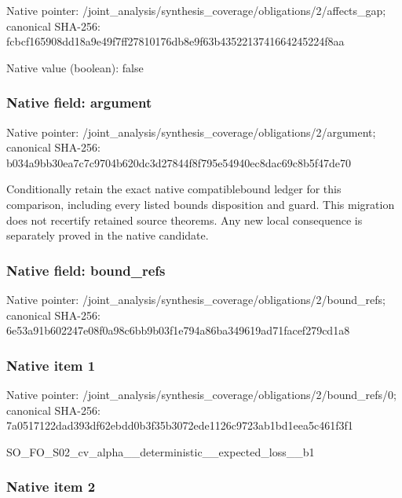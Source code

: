 \documentclass[10pt,a4paper]{article}
\begin{document}
Native pointer: /joint\_analysis/synthesi\allowbreak{}s\_coverage/obligations/2\allowbreak{}/affects\_gap; canonical SHA-256: fcbcf165908dd18a9e49f7ff\allowbreak{}27810176db8e9f63b4352213\allowbreak{}741664245224f8aa



Native value (boolean): false



\subsubsection{Native field: argument}


Native pointer: /joint\_analysis/synthesi\allowbreak{}s\_coverage/obligations/2\allowbreak{}/argument; canonical SHA-256: b034a9bb30ea7c7c9704b620\allowbreak{}dc3d27844f8f795e54940ec8\allowbreak{}dac69c8b5f47de70


Conditionally retain the exact native compatiblebound ledger for this comparison, including every listed bounds disposition and guard. This migration does not recertify retained source theorems. Any new local consequence is separately proved in the native candidate.


\subsubsection{Native field: bound\_refs}


Native pointer: /joint\_analysis/synthesi\allowbreak{}s\_coverage/obligations/2\allowbreak{}/bound\_refs; canonical SHA-256: 6e53a91b602247e08f0a98c6\allowbreak{}bb9b03f1e794a86ba349619a\allowbreak{}d71facef279cd1a8



\subsubsection{Native item 1}


Native pointer: /joint\_analysis/synthesi\allowbreak{}s\_coverage/obligations/2\allowbreak{}/bound\_refs/0; canonical SHA-256: 7a0517122dad393df62ebdd0\allowbreak{}b3f35b3072ede1126c9723ab\allowbreak{}1bd1eea5c461f3f1


SO\_FO\_S02\_cv\_alpha\_\_dete\allowbreak{}rministic\_\_expected\_loss\allowbreak{}\_\_b1


\subsubsection{Native item 2}
\end{document}
